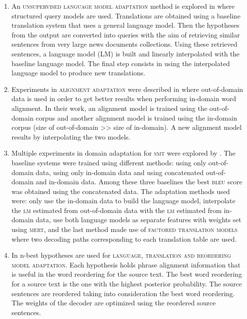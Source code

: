 \documentclass[output=paper]{LSP/langsci}
\begin{document}
\begin{enumerate}
\sloppy
\item 
An \textsc{unsupervised language model adaptation} method is explored in \citet{ZhaoEtAl2004} where structured query models are used. Translations are obtained using a baseline translation system that uses a general language model. Then the hypotheses from the output are converted into queries with the aim of retrieving similar sentences from very large news documents collections. Using these retrieved sentences, a language model (\textsc{LM}) is built and linearly interpolated with the baseline language model. The final step consists in using the interpolated language model to produce new translations. 
\item 
Experiments in \textsc{alignment adaptation} were described in \citet{WuEtAl2005} where out-of-domain data is used in order to get better results when performing in-domain word alignment. In their work, an alignment model is trained using the out-of-domain corpus and another alignment model is trained using the in-domain corpus (size of out-of-domain {\textgreater}{\textgreater} size of in-domain). A new alignment model results by interpolating the two models. 
\item 
Multiple experiments in domain adaptation for \textsc{smt} were explored by \citet{Koehn2007}. The baseline systems were trained using different methods: using only out-of-domain data, using only in-domain data and using concatenated out-of-domain and in-domain data. Among these three baselines the best \textsc{bleu} score was obtained using the concatenated data. The adaptation methods used were: only use the in-domain data to build the language model, interpolate the \textsc{lm} estimated from out-of-domain data with the \textsc{lm} estimated from in-domain data, use both language models as separate features with weights set using \textsc{mert}, and the last method made use of \textsc{factored translation models} where two decoding paths corresponding to each translation table are used. 
\item 
In \citet{ChenEtAl2008} n-best hypotheses are used for \textsc{language, translation and reordering model adaptation}. Each hypothesis holds phrase alignment information that is useful in the word reordering for the source text. The best word reordering for a source text is the one with the highest posterior probability. The source sentences are reordered taking into consideration the best word reordering. The weights of the decoder are optimized using the reordered source sentences. 

\end{enumerate}
\end{document}
